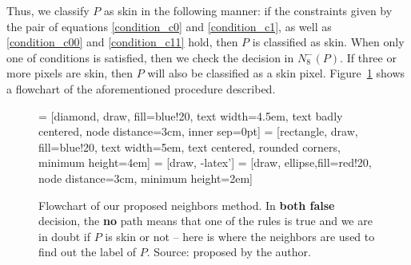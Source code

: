 Thus, we classify $P$ as skin in the following manner: if the constraints given by the pair of equations \ref{condition_c0} and \ref{condition_c1}, as well as \ref{condition_c00} and \ref{condition_c11} hold, then $P$ is classified as skin. When only one of conditions is satisfied, then we check the decision in $N_8^-(P)$. If three or more pixels are skin, then $P$ will also be classified as a skin pixel. Figure~\ref{fig:n8-flowchart} shows a flowchart of the aforementioned procedure described.

\begin{figure}[ht]
    \centering

     = [diamond, draw, fill=blue!20,
        text width=4.5em, text badly centered, node distance=3cm, inner sep=0pt]
     = [rectangle, draw, fill=blue!20,
        text width=5em, text centered, rounded corners, minimum height=4em]
     = [draw, -latex']
     = [draw, ellipse,fill=red!20, node distance=3cm,
        minimum height=2em]


    \caption[Flowchart of our proposed neighbors method]{Flowchart of our proposed neighbors method. In \textbf{both false} decision, the \textbf{no} path means that one of the rules is true and we are in doubt if $P$ is skin or not -- here is where the neighbors are used to find out the label of $P$. Source: proposed by the author.}
    \label{fig:n8-flowchart}
\end{figure}


